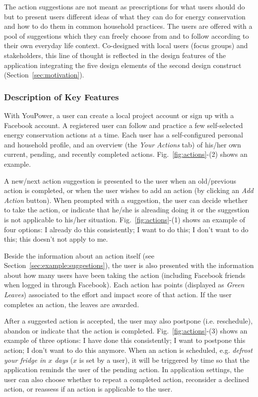 \documentclass[a4paper]{article}
\begin{document}
The action suggestions are not meant as prescriptions for what users should do but to present users different ideas of what they can do for energy conservation and how to do them in common household practices. The users are offered with a pool of suggestions which they can freely choose from and to follow according to their own everyday life context. Co-designed with local users (focus groups) and stakeholders, this line of thought is reflected in the design features of the application integrating the five design elements of the second design construct (Section~\ref{sec:motivation}).  


\subsubsection{Description of Key Features}
\label{sec:example:motivation:features}

With YouPower, a user can create a local project account or sign up with a Facebook account. A registered user can follow and practice a few self-selected energy conservation actions at a time. Each user has a self-configured personal and household profile, and an overview (the \textit{Your Actions} tab) of his/her own current, pending, and recently completed actions. Fig.~\ref{fig:actions}-(2) shows an example. 

A new/next action suggestion is presented to the user when an old/previous action is completed, or when the user wishes to add an action (by clicking an \textit{Add Action} button). When prompted with a suggestion, the user can decide whether to take the action, or indicate that he/she is alreading doing it or the suggestion is not applicable to his/her situation. Fig.~\ref{fig:actions}-(1) shows an example of four options: I already do this consistently; I want to do this; I don't want to do this; this doesn't not apply to me. 

Beside the information about an action itself (see Section~\ref{sec:example:suggestions}), the user is also presented with the information about how many users have been taking the action (including Facebook friends when logged in through Facebook). Each action has points (displayed as \textit{Green Leaves}) associated to the effort and impact score of that action. If the user completes an action, the leaves are awarded. 

After a suggested action is accepted, the user may also postpone (i.e. reschedule), abandon or indicate that the action is completed. Fig.~\ref{fig:actions}-(3) shows an example of three options: I have done this consistently; I want to postpone this action; I don't want to do this anymore. When an action is scheduled, e.g. \textit{defrost your fridge in $x$ days} ($x$ is set by a user), it will be triggered by time so that the application reminds the user of the pending action. In application settings, the user can also choose whether to repeat a completed action, reconsider a declined action, or reassess if an action is applicable to the user. 
\end{document}
